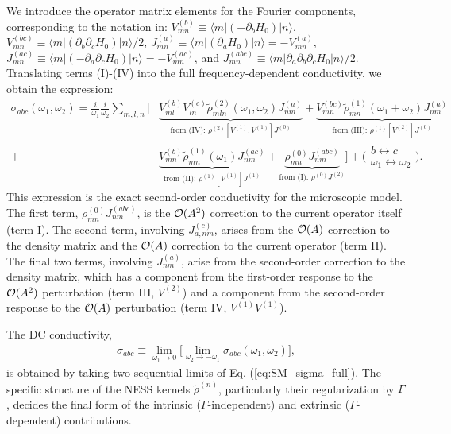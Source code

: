 \documentclass[twocolumn, prx, reprint, amsfonts, amsmath, amssymb, longbibliography, floatfix, aps]{revtex4-2}
\begin{document}
We introduce the operator matrix elements for the Fourier components, corresponding to the notation in:
$V_{mn}^{(b)} \equiv \langle m | (-\partial_b H_0) | n \rangle$, $V_{mn}^{(bc)} \equiv \langle m | (\partial_b \partial_c H_0) | n \rangle / 2$, $J_{mn}^{(a)} \equiv \langle m | (\partial_a H_0) | n \rangle = - V_{mn}^{(a)}$, $J_{mn}^{(ac)} \equiv \langle m | (-\partial_a \partial_c H_0) | n \rangle = - V_{mn}^{(ac)} $, and $J_{mn}^{(abc)} \equiv \langle m | \partial_a \partial_b \partial_c H_0 | n \rangle / 2$.
Translating terms (I)-(IV) into the full frequency-dependent conductivity, we obtain the expression:
\begin{align}
\sigma_{abc} (\omega_1, \omega_2) = \frac{i}{\omega_1} \frac{i}{\omega_2} \sum_{m,l,n} \bigg[
& \underbrace{ V_{ml}^{(b)} V_{ln}^{(c)} \tilde{\rho}_{mln}^{(2)} (\omega_1,\omega_2) J_{nm}^{(a)} }_{\text{from (IV): } \rho^{(2)}[V^{(1)},V^{(1)}] J^{(0)}}
+ \underbrace{ V_{mn}^{(bc)} \tilde{\rho}_{mn}^{(1)} (\omega_1+\omega_2) J_{nm}^{(a)} }_{\text{from (III): } \rho^{(1)}[V^{(2)}] J^{(0)}}
\nonumber \\
+ & \underbrace{ V_{mn}^{(b)} \tilde{\rho}_{mn}^{(1)} (\omega_1) J_{nm}^{(ac)} }_{\text{from (II): } \rho^{(1)}[V^{(1)}] J^{(1)}}
+ \underbrace{ \rho_{mn}^{(0)} J_{nm}^{(abc)} }_{\text{from (I): } \rho^{(0)} J^{(2)}}
\bigg]
+ \Big(
\begin{matrix}
b \leftrightarrow c
\\
\omega_1 \leftrightarrow \omega_2
\end{matrix}
\Big).
\label{eq:SM_sigma_full}
\end{align}
This expression is the exact second-order conductivity for the microscopic model. The first term, $\rho_{mn}^{(0)} J_{nm}^{(abc)}$, is the ${\cal O}(A^2)$ correction to the current operator itself (term I). The second term, involving $J_{a,nm}^{(c)}$, arises from the ${\cal O}(A)$ correction to the density matrix and the ${\cal O}(A)$ correction to the current operator (term II). The final two terms, involving $J_{nm}^{(a)}$, arise from the second-order correction to the density matrix, which has a component from the first-order response to the ${\cal O}(A^2)$ perturbation (term III, $V^{(2)}$) and a component from the second-order response to the ${\cal O}(A)$ perturbation (term IV, $V^{(1)}V^{(1)}$).

The DC conductivity, 
\begin{align}
\sigma_{abc} \equiv \lim_{\omega_1 \to 0}
\Big[\lim_{\omega_2 \to -\omega_1} \sigma_{abc}(\omega_1, \omega_2) \Big] ,
\end{align}
is obtained by taking two sequential limits of Eq. (\ref{eq:SM_sigma_full}). The specific structure of the NESS kernels $\tilde{\rho}^{(n)}$, particularly their regularization by $\Gamma$, decides the final form of the intrinsic ($\Gamma$-independent) and extrinsic ($\Gamma$-dependent) contributions.
\end{document}
